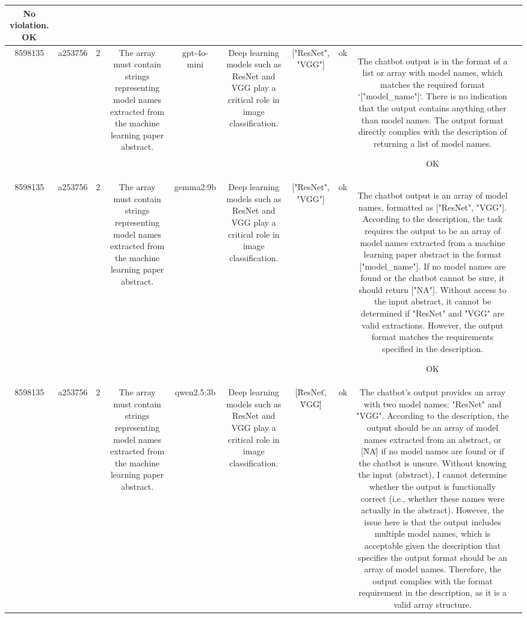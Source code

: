 \begin{table}[h!]
\begin{tabular}{|c|c|c|c|c|c|c|c|c|c|}
No violation.
OK & \\
\hline
8598135 & a253756 & 2 & The array must contain strings representing model names extracted from the machine learning paper abstract. & gpt-4o-mini & Deep learning models such as ResNet and VGG play a critical role in image classification. & ["ResNet", "VGG"] & ok & The chatbot output is in the format of a list or array with model names, which matches the required format `["model_name"]`. There is no indication that the output contains anything other than model names. The output format directly complies with the description of returning a list of model names.

OK & \\
\hline
8598135 & a253756 & 2 & The array must contain strings representing model names extracted from the machine learning paper abstract. & gemma2:9b & Deep learning models such as ResNet and VGG play a critical role in image classification. & ["ResNet", "VGG"] 
 & ok & The chatbot output is an array of model names, formatted as ["ResNet", "VGG"]. According to the description, the task requires the output to be an array of model names extracted from a machine learning paper abstract in the format ["model_name"]. If no model names are found or the chatbot cannot be sure, it should return ["NA"]. Without access to the input abstract, it cannot be determined if "ResNet" and "VGG" are valid extractions. However, the output format matches the requirements specified in the description.

OK & \\
\hline
8598135 & a253756 & 2 & The array must contain strings representing model names extracted from the machine learning paper abstract. & qwen2.5:3b & Deep learning models such as ResNet and VGG play a critical role in image classification. & [\"ResNet\", \"VGG\"] & ok & The chatbot's output provides an array with two model names: "ResNet" and "VGG". According to the description, the output should be an array of model names extracted from an abstract, or [\"NA\"] if no model names are found or if the chatbot is unsure. Without knowing the input (abstract), I cannot determine whether the output is functionally correct (i.e., whether these names were actually in the abstract). However, the issue here is that the output includes multiple model names, which is acceptable given the description that specifies the output format should be an array of model names. Therefore, the output complies with the format requirement in the description, as it is a valid array structure.


\end{tabular}
\end{table}
